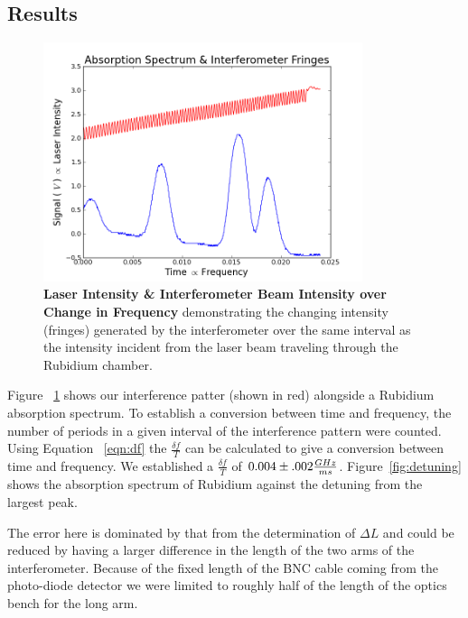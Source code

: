 \documentclass[paper=a4, fontsize=11pt]{scrartcl} %
\numberwithin{equation}{section}
\numberwithin{figure}{section}
\numberwithin{table}{section}
\begin{document}
\subsection{Results}
\begin{figure}[h] \begin{center}
  \includegraphics[height=70mm]{4-1-009.png}
  \caption{\textbf{Laser Intensity \& Interferometer Beam Intensity over Change in Frequency} demonstrating the changing intensity (fringes) generated by the interferometer over the same interval as the intensity incident from the laser beam traveling through the Rubidium chamber. }
  \label{fig:int_1}
\end{center} \end{figure}

Figure ~\ref{fig:int_1} shows our interference patter (shown in red)
alongside a Rubidium absorption spectrum. To establish a conversion
between time and frequency, the number of periods in a given interval of
the interference pattern were counted. Using Equation ~\ref{eqn:df}
the $\frac{\delta f}{T}$ can be calculated to give a conversion
between time and frequency. We established a $\frac{\delta f}{T}$ of
$0.004 \pm
.002\frac{\normalfont{GHz}}{\normalfont{ms}}$. Figure~\ref{fig:detuning}
shows the absorption spectrum of Rubidium against the detuning from
the largest peak. 

The error here is dominated by that from the determination of $\Delta L$ and
could be reduced by having a larger difference in the length of the
two arms of the interferometer. Because of the fixed length of the BNC
cable coming from the photo-diode detector we were limited to roughly
half of the length of the optics bench for the long arm.  
\end{document}
